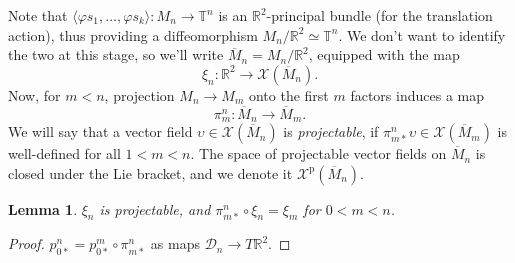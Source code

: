 \documentclass{article}
\def\sD{\mathscr{D}}
\def\RR{\mathbb{R}}
\def\TT{\mathbb{T}}
\def\XX{\mathscr{X}}
\def\p{\mathrm{p}}
\newtheorem{lem}{Lemma}
\theoremstyle{definition}
\begin{document}
Note that $\langle \varphi s_1,\dots,\varphi s_k\rangle : M_n \to \TT^n$ 
is an $\RR^2$-principal bundle (for the translation action), thus providing
a diffeomorphism
$M_n/\RR^2 \simeq \TT^n$. We don't want to identify the two at this stage,
so we'll write $\overline M_n = M_n/\RR^2$, equipped with the map
$$\xi_n:\RR^2 \to \XX(\overline M_n).$$ Now, for $m<n$, projection $M_n\to M_m$ onto 
the first $m$ factors induces a map
$$ \pi^n_m : \overline M_n \to \overline M_m. $$
We will say that a vector field $\upsilon \in \XX(\overline M_n)$ is \emph{projectable},
if $\pi^n_{m*}\upsilon \in \XX(\overline M_m)$ is well-defined for all $1 < m < n$.
The space of projectable vector fields on $\overline M_n$ is closed under the Lie bracket,
and we denote it $\XX^\p(\overline M_n)$.

\begin{lem}\label{lem:xi-proj}
        $\xi_n$ is projectable, and $\pi^n_{m*}\circ\xi_n = \xi_m$ for $0 < m < n$.
\end{lem}
\begin{proof}
        $p^n_{0*} = p^m_{0*} \circ \pi^n_{m*}$ as maps $\sD_n \to T\RR^2$.
\end{proof}
\end{document}
